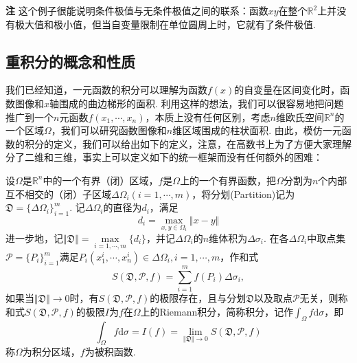 \documentclass{ctexart}
\newenvironment{custom}[1]{\par\noindent \textbf{#1}\quad}{\par\vspace{1em}}
\begin{document}
\begin{custom}{注}
这个例子很能说明条件极值与无条件极值之间的联系：函数$xy$在整个$\mathbb{R}^{2}$上并没有极大值和极小值，但当自变量限制在单位圆周上时，它就有了条件极值.
\end{custom}

\subsection{重积分的概念和性质}
我们已经知道，一元函数的积分可以理解为函数$f(x)$的自变量在区间变化时，函数图像和$x$轴围成的曲边梯形的面积. 利用这样的想法，我们可以很容易地把问题推广到一个$n$元函数$f(x_{1},\cdots,x_{n})$，本质上没有任何区别，考虑$n$维欧氏空间$\mathbb{R}^{n}$的一个区域$\Omega$，我们可以研究函数图像和$n$维区域围成的柱状面积. 由此，模仿一元函数的积分的定义，我们可以给出如下的定义，注意，在高数书上为了方便大家理解分了二维和三维，事实上可以定义如下的统一框架而没有任何额外的困难：

\begin{definition}
设$\Omega$是$\mathbb{R}^{n}$中的一个有界（闭）区域，$f$是$\Omega$上的一个有界函数，把$\Omega$分割为$n$个内部互不相交的（闭）子区域$\Delta \Omega_{i}(i=1,\cdots,m)$，将分划(Partition)记为$\mathfrak{D}=\{\Delta\Omega_{i}\}_{i=1}^{m}$. 记$\Delta\Omega_{i}$的直径为$d_{i}$，满足
$$d_{i}=\max_{x,y\in\Omega_{i}}{\Vert x-y\Vert}$$
进一步地，记$\Vert\mathfrak{D}\Vert=\max\limits_{i=1,\cdots,m}{\{d_{i}\}}$，并记$\Delta\Omega_{i}$的$n$维体积为$\Delta\sigma_{i}$. 在各$\Delta\Omega_{i}$中取点集$\mathcal{P}=\{P_{i}\}_{i=1}^{m}$满足$P_{i}(x^{i}_{1},\cdots,x^{i}_{n})\in\Delta\Omega_{i},i=1,\cdots,m$，作和式
$$S(\mathfrak{D},\mathcal{P},f)=\sum_{i=1}^{m}{f(P_{i})\Delta\sigma_{i}},$$
如果当$\Vert\mathfrak{D}\Vert\to 0$时，有$S(\mathfrak{D},\mathcal{P},f)$的极限存在，且与分划$\mathfrak{D}$以及取点$\mathcal{P}$无关，则称和式$S(\mathfrak{D},\mathcal{P},f)$的极限$I$为$f$在$\Omega$上的Riemann积分，简称积分，记作$\int_{\Omega}{f\mathrm{d}\sigma}$，即
$$\int_{\Omega}{f\mathrm{d}\sigma}=I(f)=\lim\limits_{\Vert\mathfrak{D}\Vert\to 0}{S(\mathfrak{D},\mathcal{P},f)}$$
称$\Omega$为积分区域，$f$为被积函数.
\end{definition}
\end{document}
